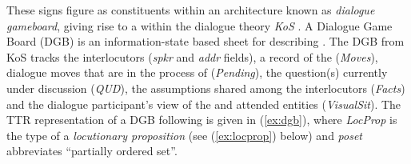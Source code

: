 \documentclass[output=paper
 	        ,biblatex
                ,babelshorthands
                ,newtxmath
                ,draftmode
                ,colorlinks, citecolor=brown
]{langscibook}
\begin{document}
These \HPSGTTR signs figure as constituents within an architecture known as \emph{dialogue gameboard}, giving rise to a  within the dialogue theory \emph{KoS}
\citep{Ginzburg:1994,Ginzburg:1996,Ginzburg:2003,Ginzburg:2012}. 
%
A Dialogue Game Board (DGB) is an information-state based sheet for describing .
%
The DGB from KoS tracks the interlocutors (\textit{spkr} and \textit{addr} fields), a record of the  (\textit{Moves}), dialogue moves that are in the process of  (\textit{Pending}), the question(s) currently under discussion (\textit{QUD}), the assumptions shared among the interlocutors (\textit{Facts}) and   the dialogue
participant's view of 
the  and attended entities (\textit{VisualSit}).
%
The TTR representation of a DGB following \citet{Ginzburg:2012} is given in (\ref{ex:dgb}), where \textit{LocProp} is the type of a \emph{locutionary proposition} (see (\ref{ex:locprop}) below) and \textit{poset} abbreviates \enquote{partially ordered set}.
%
\ea \label{ex:dgb}
\z
\end{document}
